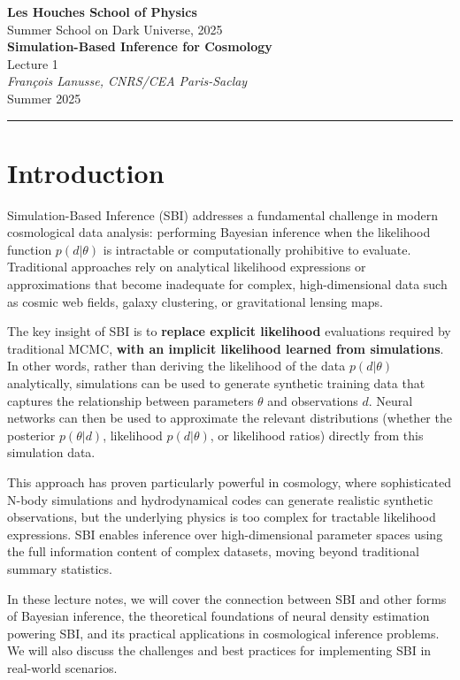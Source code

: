 \documentclass[11pt,a4paper]{article}
\makeatletter
\theoremstyle{definition}
\newcommand{\lecturetitle}[1]{\gdef\@lecturetitle{#1}}
\newcommand{\lecturer}[1]{\gdef\@lecturer{#1}}
\newcommand{\lecturedate}[1]{\gdef\@lecturedate{#1}}
\newcommand{\lecturenumber}[1]{\gdef\@lecturenumber{#1}\gdef\thelecturenumber{#1}}
\gdef\@lecturetitle{Lecture Title}
\gdef\@lecturer{Lecturer Name}
\gdef\@lecturedate{\today}
\gdef\@lecturenumber{1}
\renewcommand{\maketitle}{
    \begin{center}
        {\Large\textcolor{leshouches}{\textbf{Les Houches School of Physics}}}\\[0.5em]
        {\large Summer School on Dark Universe, 2025}\\[1.5em]
        {\huge\textbf{\@lecturetitle}}\\[0.5em]
        {\large Lecture \@lecturenumber}\\[1em]
        {\large\textit{\@lecturer}}\\[0.5em]
        {\@lecturedate}
    \end{center}
    \vspace{1em}
    \hrule
    \vspace{1.5em}
}
\makeatother
\begin{document}
\lecturetitle{Simulation-Based Inference for Cosmology}
\lecturer{François Lanusse, CNRS/CEA Paris-Saclay}
\lecturedate{Summer 2025}
\lecturenumber{1}

\maketitle

\section*{Introduction}

Simulation-Based Inference (SBI) addresses a fundamental challenge in modern cosmological data analysis: performing Bayesian inference when the likelihood function $p(d|\theta)$ is intractable or computationally prohibitive to evaluate. Traditional approaches rely on analytical likelihood expressions or approximations that become inadequate for complex, high-dimensional data such as cosmic web fields, galaxy clustering, or gravitational lensing maps.

The key insight of SBI is to \textbf{replace explicit likelihood} evaluations required by traditional MCMC, \textbf{with an implicit likelihood learned from simulations}. In other words, rather than deriving the likelihood of the data $p(d|\theta)$ analytically, simulations can be used to generate synthetic training data that captures the relationship between parameters $\theta$ and observations $d$. Neural networks can then be used to approximate the relevant distributions (whether the posterior $p(\theta|d)$, likelihood $p(d|\theta)$, or likelihood ratios) directly from this simulation data.

This approach has proven particularly powerful in cosmology, where sophisticated N-body simulations and hydrodynamical codes can generate realistic synthetic observations, but the underlying physics is too complex for tractable likelihood expressions. SBI enables inference over high-dimensional parameter spaces using the full information content of complex datasets, moving beyond traditional summary statistics.

In these lecture notes, we will cover the connection between SBI and other forms of Bayesian inference, the theoretical foundations of neural density estimation powering SBI, and its practical applications in cosmological inference problems. We will also discuss the challenges and best practices for implementing SBI in real-world scenarios.
\end{document}
